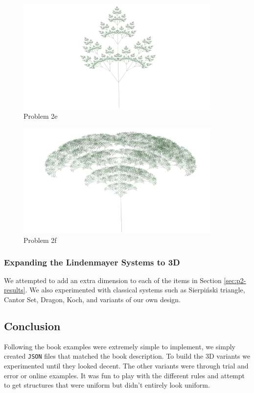 \begin{figure}[H]
\centering
\noindent\includegraphics[width=0.90\textwidth]{figures/L-systems/e}
\caption{Problem 2e}
\label{fig:prob2e}
\end{figure}

\begin{figure}[H]
\centering
\noindent\includegraphics[width=0.90\textwidth]{figures/L-systems/f}
\caption{Problem 2f}
\label{fig:prob2f}
\end{figure}

\subsubsection{Expanding the Lindenmayer Systems to 3D}
We attempted to add an extra dimension to each of the items in Section 
\ref{sec:p2-results}. We also experimented with classical systems such as 
Sierpiński triangle, Cantor Set, Dragon, Koch, and variants of our own design.



\subsection{Conclusion}
Following the book examples were extremely simple to implement, we simply 
created \texttt{JSON} files that matched the book description. To build the 3D 
variants we experimented until they looked decent. The other variants were 
through trial and error or online examples. It was fun to play with the 
different rules and attempt to get structures that were uniform but didn't 
entirely look uniform. 